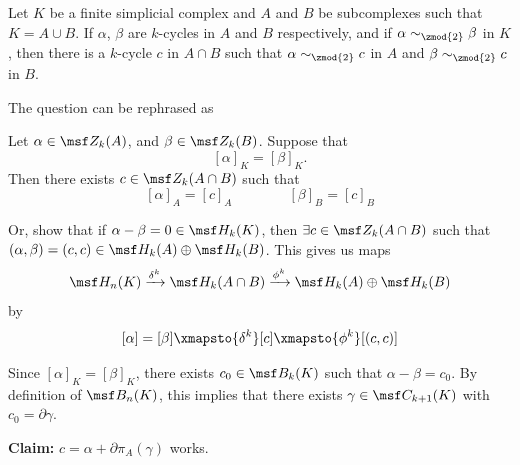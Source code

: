\begin{problem}[16.33]
  Let $K$ be a finite simplicial complex and $A$ and $B$ be
  subcomplexes such that $K=A\cup B$. If $\alpha$, $\beta$ are
  $k$-cycles in $A$ and $B$ respectively, and if $\alpha
  \sim_{\zmod{2}} \beta$ in $K$, then there is a $k$-cycle $c$ in
  $A\cap B$ such that $\alpha \sim_{\zmod{2}} c$ in $A$ and $\beta
  \sim_{\zmod{2}} c$ in $B$.
\end{problem}
\begin{solution}
  The question can be rephrased as
  \begin{leftbar}
    Let $\alpha \in \msf Z_k(A)$, and $\beta \in \msf Z_k(B)$. Suppose
    that
    \[
      [\alpha]_K = [\beta]_K.
    \]
    Then there exists $c \in \msf Z_k(A \cap B)$ such that
    \[
      [\alpha]_A = [c]_A \qquad\qquad [\beta]_B = [c]_B
    \]

    Or, show that if $\alpha - \beta = 0 \in \msf H_k(K)$, then
    $\exists c \in \msf Z_k(A \cap B)$ such that $(\alpha, \beta) =
    (c,c) \in \msf H_k(A) \oplus \msf H_k(B)$. This gives us maps
    \[
      \msf H_n(K) \xrightarrow{\delta^{k}} \msf H_k(A \cap B)
      \xrightarrow{\phi^{k}}  \msf H_k(A) \oplus \msf H_k(B)
    \]
    by
    \[
      [\alpha] = [\beta] \xmapsto{\delta^k} [c] \xmapsto{\phi^k}
      [(c,c)]
    \]
  \end{leftbar}
  Since $[\alpha]_K = [\beta]_K$, there exists $c_0 \in \msf B_k(K)$
  such that $\alpha - \beta = c_0$. By definition of $\msf B_n(K)$,
  this implies that there exists $\gamma \in \msf C_{k+1}(K)$ with
  $c_0 = \partial \gamma$.

  \textbf{Claim:} $c = \alpha + \partial \pi_A(\gamma)$ works.


\end{solution}
